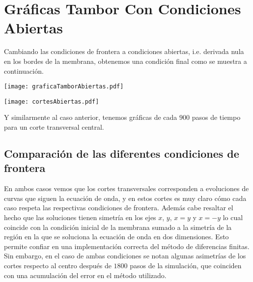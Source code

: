 \documentclass[12pt, letterpaper]{article}
\begin{document}
\section{Gr\'aficas Tambor Con Condiciones Abiertas}
Cambiando las condiciones de frontera a condiciones abiertas, i.e. derivada nula en los bordes de la membrana, obtenemos una condición final como se muestra a continuación.
\begin{center}

\texttt{[image: graficaTamborAbiertas.pdf]}  
\end{center}
\texttt{[image: cortesAbiertas.pdf]} 

Y similarmente al caso anterior, tenemos gráficas de cada $900$ pasos de tiempo para un corte transversal central. 

\subsection{Comparación de las diferentes condiciones de frontera}

En ambos casos vemos que los cortes transversales corresponden a evoluciones de curvas que siguen la ecuación de onda, y en estos cortes es muy claro cómo cada caso respeta las respectivas condiciones de frontera. Además cabe resaltar el hecho que las soluciones tienen simetría en los ejes $x$, $y$, $x=y$ y $x=-y$ lo cual coincide con la condición inicial de la membrana sumado a la simetría de la región en la que se soluciona la ecuación de onda en dos dimensiones. Esto permite confiar en una implementación correcta del método de diferencias finitas. Sin embargo, en el caso de ambas condiciones se notan algunas asimetrías de los cortes respecto al centro después de $1800$ pasos de la simulación, que coinciden con una acumulación del error en el método utilizado.
 
\end{document}
